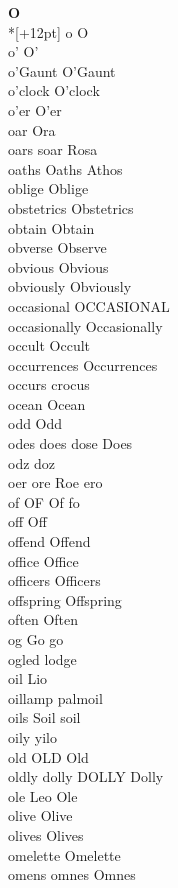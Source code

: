 \vspace{14pt}
\noindent\textbf{\Large O}\\*[+12pt]
o O\\
o' O'\\
o'Gaunt O'Gaunt\\
o'clock O'clock\\
o'er O'er\\
oar Ora\\
oars soar Rosa\\
oaths Oaths Athos\\
oblige Oblige\\
obstetrics Obstetrics\\
obtain Obtain\\
obverse Observe\\
obvious Obvious\\
obviously Obviously\\
occasional OCCASIONAL\\
occasionally Occasionally\\
occult Occult\\
occurrences Occurrences\\
occurs crocus\\
ocean Ocean\\
odd Odd\\
odes does dose Does\\
odz doz\\
oer ore Roe ero\\
of OF Of fo\\
off Off\\
offend Offend\\
office Office\\
officers Officers\\
offspring Offspring\\
often Often\\
og Go go\\
ogled lodge\\
oil Lio\\
oillamp palmoil\\
oils Soil soil\\
oily yilo\\
old OLD Old\\
oldly dolly DOLLY Dolly\\
ole Leo Ole\\
olive Olive\\
olives Olives\\
omelette Omelette\\
omens omnes Omnes\\
